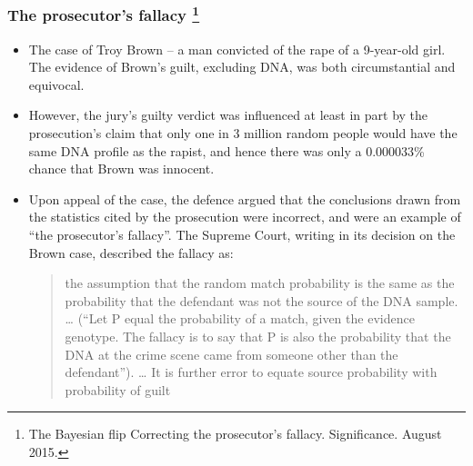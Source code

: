 \documentclass[10pt]{beamer}\usepackage[]{graphicx}\usepackage[]{color}
\begin{document}
\begin{frame}
	\frametitle{The prosecutor's fallacy \footnote{\tiny{The Bayesian flip
Correcting the prosecutor's fallacy. Significance. August 2015.}}}
	
	\begin{itemize}
		\setlength\itemsep{1em}
		\item The case of Troy Brown – a man
convicted of the rape of a 9-year-old girl. The
evidence of Brown's guilt, excluding DNA,
was both circumstantial and equivocal.
		\item However, the jury's guilty verdict was influenced at least in part by the prosecution's
claim that only one in 3 million random
people would have the same DNA profile
as the rapist, and hence there was only a
		0.000033\% chance that Brown was innocent. \pause
		\item Upon appeal of the case, the defence
argued that the conclusions drawn from
the statistics cited by the prosecution were
incorrect, and were an example of ``the prosecutor's fallacy''. The Supreme Court,
writing in its decision on the Brown case,
described the fallacy as:
		\begin{quote}
		the assumption that the random match
probability is the same as the probability
that the defendant was not the source
of the DNA sample. … (“Let P equal
the probability of a match, given the evidence genotype. The fallacy is to say that
P is also the probability that the DNA at
the crime scene came from someone other than the defendant”). … It is further
error to equate source probability with
probability of guilt
		\end{quote}
	\end{itemize}
	
\end{frame}
\end{document}
